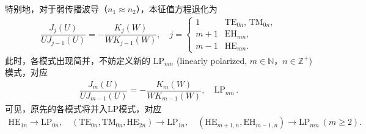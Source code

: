 特别地，对于弱传播波导（\(n_1\approx n_2\)），本征值方程退化为
\begin{align*}
	\dfrac{J_j(U)}{U J_{j-1}(U)} = -\dfrac{K_j(W)}{W K_{j-1}(W)}, \quad j =
	\begin{cases}
		1   & \mathrm{TE}_{0n}, \, \mathrm{TM}_{0n} , \\
		m+1 & \mathrm{EH}_{mn} ,                      \\
		m-1 & \mathrm{HE}_{mn} .
	\end{cases}
\end{align*}
此时，各模式出现简并，不妨定义新的 \(\mathrm{LP}_{mn}\) (linearly polarized, \(m \in \mathbb{N}\)，\(n \in \mathbb{Z}^+\)) 模式，对应
\begin{align*}
	\dfrac{J_m(U)}{U J_{m-1}(U)} = -\dfrac{K_m(W)}{W K_{m-1}(W)}, \quad \mathrm{LP}_{mn} \, .
\end{align*}
可见，原先的各模式将并入LP模式，对应
\begin{align*}
	\mathrm{HE}_{1n} \to \mathrm{LP}_{0n},\quad (\mathrm{TE}_{0n}, \mathrm{TM}_{0n}, \mathrm{HE}_{2n}) \to \mathrm{LP}_{1n},\quad (\mathrm{HE}_{m+1,n}, \mathrm{EH}_{m-1,n}) \to \mathrm{LP}_{mn}\ (m \geq 2).
\end{align*}

